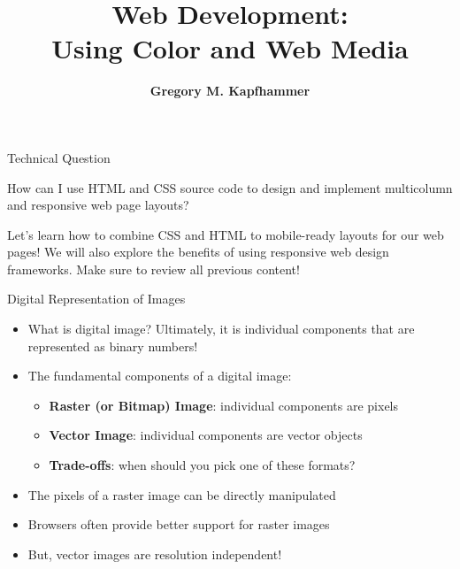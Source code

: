 \documentclass[14pt,aspectratio=169]{beamer}
\title{Web Development: \\ Using Color and Web Media}
\author{{\bf Gregory M. Kapfhammer}}
\institute[shortinst]{{\bf Department of Computer Science, Allegheny College}}
\begin{document}
{
  \begin{frame}
    \titlepage
  \end{frame}
}

%
\begin{frame}{Technical Question}
  \hspace*{.25in}
  \vspace*{.2in}
  \begin{minipage}{5in}
    \begin{center}
      {\large How can I use HTML and CSS source code to design and implement
      multicolumn and responsive web page layouts?}
    \end{center}
  \end{minipage}
  \vspace{2ex}
  \begin{center}
    \small Let's learn how to combine CSS and HTML to mobile-ready layouts for
    our web pages! We will also explore the benefits of using
    responsive web design frameworks. Make sure to review all previous content!\\
  \end{center}
\end{frame}

%
\begin{frame}{Digital Representation of Images}
  \begin{itemize}
    \item What is digital image? Ultimately, it is individual components that
      are represented as binary numbers!
      \vspace*{-.15in}
    \item The fundamental components of a digital image:
      \begin{itemize}
        \item {\bf Raster (or Bitmap) Image}: individual components are pixels
        \item {\bf Vector Image}: individual components are vector objects
        \item {\bf Trade-offs}: when should you pick one of these formats?
      \end{itemize}
      \vspace*{-.2in}
    \item The pixels of a raster image can be directly manipulated
      \vspace*{-.2in}
    \item Browsers often provide better support for raster images
      \vspace*{-.2in}
    \item But, vector images are resolution independent!
  \end{itemize}
\end{frame}
\end{document}
